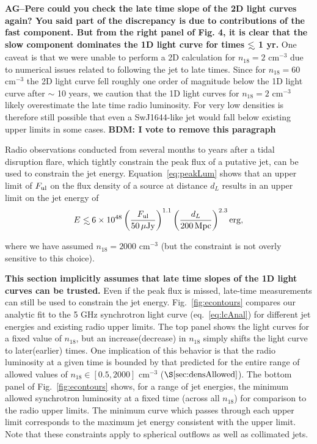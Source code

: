 \documentclass[usenatbib,fleqn]{mnras}
\newcommand\lsim{\mathrel{\rlap{\lower4pt\hbox{\hskip1pt$\sim$}}
    \raise1pt\hbox{$<$}}}
\begin{document}
{\bf AG--Pere could you check the late time slope of the 2D light
  curves again? You said part of the discrepancy is due to
  contributions of the fast component. But from the right panel of
  Fig. 4, it is clear that the slow component dominates the 1D light
  curve for times $\lsim$ 1 yr.}  One caveat is that we were unable to
perform a 2D calculation for $n_{18}=2$ cm$^{-3}$ due to numerical
issues related to following the jet to late times.  Since for
$n_{18}=60$ cm$^{-3}$ the 2D light curve fell roughly one order of
magnitude below the 1D light curve after $\sim$ 10 years, we caution
that the 1D light curves for $n_{18}=2$ cm$^{-3}$ likely overestimate
the late time radio luminosity.  For very low densities is therefore
still possible that even a SwJ1644-like jet would fall below existing
upper limits in some cases.  {\bf BDM: I vote to remove this
  paragraph}

Radio observations conducted from several months to years after a
tidal disruption flare, which tightly constrain the peak flux of a
putative jet, can be used to constrain the jet energy.
Equation~\eqref{eq:peakLum} shows that an upper limit of $F_{\rm ul}$
on the flux density of a source at distance $d_L$ results in an upper
limit on the jet energy of
\begin{equation}
E\lsim 6 \times 10^{48} \left(\frac{F_{\rm ul}}{50 \,\mu{\rm Jy}}\right)^{1.1}
  \left(\frac{d_L}{200 \,{\rm Mpc}}\right)^{2.3} {\rm erg},
\end{equation}

where we have assumed $n_{18}=2000$ cm$^{-3}$ (but the constraint is not
overly sensitive to this choice). 

{\bf This section implicitly assumes that late time slopes of the 1D
  light curves can be trusted.}  Even if the peak flux is missed,
late-time measurements can still be used to constrain the jet energy.
Fig.~\ref{fig:econtours} compares our analytic fit to the 5 GHz
synchrotron light curve (eq.~\ref{eq:lcAnal}) for different jet
energies and existing radio upper limits.  The top panel shows the
light curves for a fixed value of $n_{18}$, but an increase(decrease)
in $n_{18}$ simply shifts the light curve to later(earlier) times.
One implication of this behavior is that the radio luminosity at a
given time is bounded by that predicted for the entire range of
allowed values of $n_{18} \in [0.5,2000]$ cm$^{-3}$
($\S\ref{sec:densAllowed}$). The bottom panel of
Fig.~\ref{fig:econtours} shows, for a range of jet energies, the
minimum allowed synchrotron luminosity at a fixed time (across all
$n_{18}$) for comparison to the radio upper limits.  The minimum curve
which passes through each upper limit corresponds to the maximum jet
energy consistent with the upper limit.  Note that these constraints
apply to spherical outflows as well as collimated jets.
\end{document}
